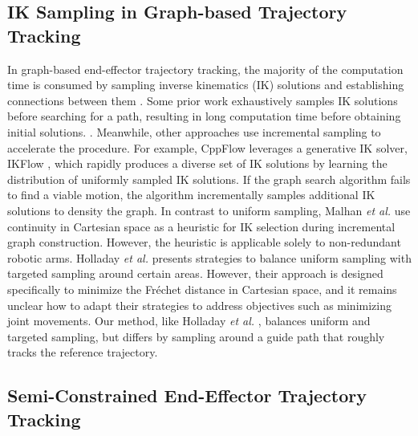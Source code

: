 \subsection{IK Sampling in Graph-based Trajectory Tracking}
In graph-based end-effector trajectory tracking, the majority of the computation time is consumed by sampling inverse kinematics (IK) solutions and establishing connections between them \cite{malhan2022generation}. 
Some prior work \cite{rakita2019stampede,wang2024iklink, Descartes,niyaz2020following} exhaustively samples IK solutions before searching for a path, resulting in long computation time before obtaining initial solutions. \cite{holladay2019minimizing,malhan2022generation}.
Meanwhile, other approaches use incremental sampling to accelerate the procedure. 
For example, CppFlow \cite{morgan2024cppflow} leverages a generative IK solver, IKFlow \cite{ames2022ikflow}, which rapidly produces a diverse set of IK solutions by learning the distribution of uniformly sampled IK solutions. If the graph search algorithm fails to find a viable motion, the algorithm incrementally samples additional IK solutions to density the graph. 
In contrast to uniform sampling, Malhan \textit{et al.} \cite{malhan2022generation} use continuity in Cartesian space as a heuristic for IK selection during incremental graph construction. However, the heuristic is applicable solely to non-redundant robotic arms. 
Holladay \textit{et al.} \cite{holladay2019minimizing} presents strategies to balance uniform sampling with targeted sampling around certain areas. However, their approach is designed specifically to minimize the Fréchet distance in Cartesian space, and it remains unclear how to adapt their strategies to address objectives such as minimizing joint movements. 
Our method, like Holladay \textit{et al.} \cite{holladay2019minimizing}, balances uniform and targeted sampling, but differs by sampling around a guide path that roughly tracks the reference trajectory. 



\vspace{-3mm}
\subsection{Semi-Constrained End-Effector Trajectory Tracking}

